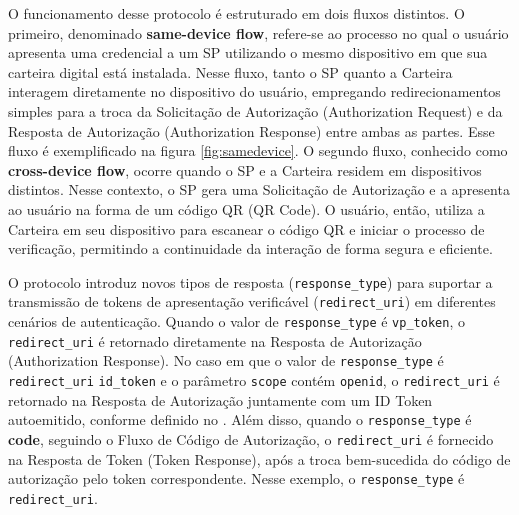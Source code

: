 O funcionamento desse protocolo é estruturado em dois fluxos distintos. O primeiro, denominado \textbf{same-device flow}, refere-se ao processo no qual o usuário apresenta uma credencial a um \acs{SP} utilizando o mesmo dispositivo em que sua carteira digital está instalada. Nesse fluxo, tanto o \acs{SP} quanto a Carteira interagem diretamente no dispositivo do usuário, empregando redirecionamentos simples para a troca da Solicitação de Autorização (Authorization Request) e da Resposta de Autorização (Authorization Response) entre ambas as partes. Esse fluxo é exemplificado na figura \autoref{fig:samedevice}. O segundo fluxo, conhecido como \textbf{cross-device flow}, ocorre quando o \acs{SP} e a Carteira residem em dispositivos distintos. Nesse contexto, o \acs{SP} gera uma Solicitação de Autorização e a apresenta ao usuário na forma de um código QR (QR Code). O usuário, então, utiliza a Carteira em seu dispositivo para escanear o código QR e iniciar o processo de verificação, permitindo a continuidade da interação de forma segura e eficiente.

O protocolo introduz novos tipos de resposta (\texttt{response\_type}) para suportar a transmissão de tokens de apresentação verificável (\texttt{redirect\_uri}) em diferentes cenários de autenticação. Quando o valor de \texttt{response\_type} é \texttt{vp\_token}, o \texttt{redirect\_uri} é retornado diretamente na Resposta de Autorização (Authorization Response). No caso em que o valor de \texttt{response\_type} é \texttt{redirect\_uri} \texttt{id\_token} e o parâmetro \texttt{scope} contém \texttt{openid}, o \texttt{redirect\_uri} é retornado na Resposta de Autorização juntamente com um ID Token autoemitido, conforme definido no \cite{SIOPv2023}. Além disso, quando o \texttt{response\_type} é \textbf{code}, seguindo o Fluxo de Código de Autorização, o \texttt{redirect\_uri} é fornecido na Resposta de Token (Token Response), após a troca bem-sucedida do código de autorização pelo token correspondente. Nesse exemplo, o \texttt{response\_type} é \texttt{redirect\_uri}.



